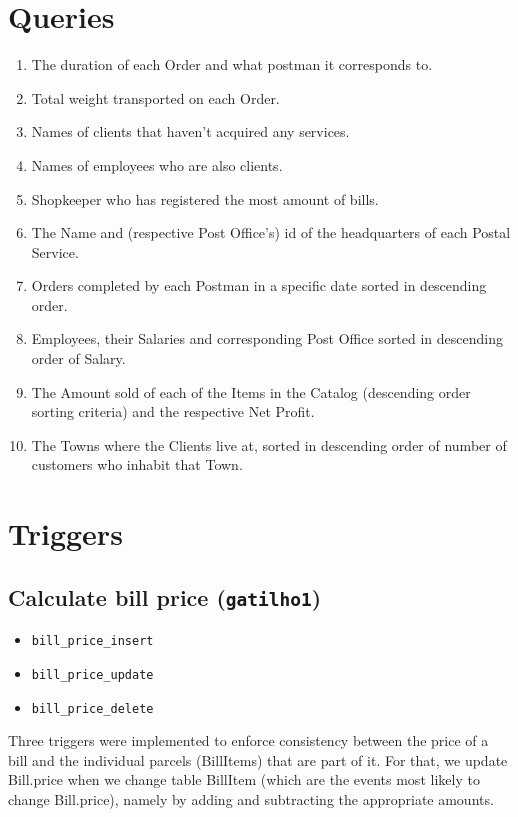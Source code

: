 \documentclass{report}[a4paper]
\theoremstyle{remark}
\begin{document}
\chapter{Queries}

\begin{enumerate}
    \item The duration of each Order and what postman it corresponds to.
    \item Total weight transported on each Order.
    \item Names of clients that haven't acquired any services.
    \item Names of employees who are also clients.
    \item Shopkeeper who has registered the most amount of bills.
    \item The Name and (respective Post Office's) id of the headquarters of each Postal Service.
    \item Orders completed by each Postman in a specific date sorted in descending order.
    \item Employees, their Salaries and corresponding Post Office sorted in descending order of Salary.
    \item The Amount sold of each of the Items in the Catalog (descending order sorting criteria) and the respective Net Profit.
    \item The Towns where the Clients live at, sorted in descending order of number of customers who inhabit that Town.
\end{enumerate}

\chapter{Triggers}
\section{Calculate bill price (\texttt{gatilho1})}
\begin{itemize}
    \item \texttt{bill\_price\_insert}
    \item \texttt{bill\_price\_update}
    \item \texttt{bill\_price\_delete}
\end{itemize}
Three triggers were implemented to enforce consistency between the price of a bill and the individual parcels (BillItems) that are part of it. For that, we update Bill.price when we change table BillItem (which are the events most likely to change Bill.price), namely by adding and subtracting the appropriate amounts.
\end{document}
